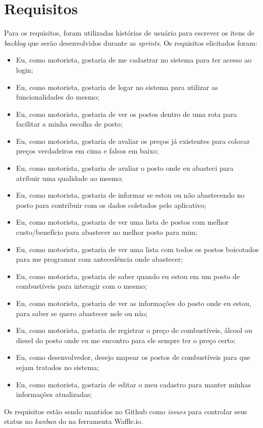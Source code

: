 \section{Requisitos}

Para os requisitos, foram utilizadas histórias de usuário para escrever os itens de \textit{backlog} que serão desenvolvidos durante as \textit{sprints}. Os requisitos elicitados foram:
\begin{itemize}
    \item Eu, como motorista, gostaria de me cadastrar no sistema para ter acesso ao login;
    \item Eu, como motorista, gostaria de logar no sistema para utilizar as funcionalidades do mesmo;
    \item Eu, como motorista, gostaria de ver os postos dentro de uma rota para facilitar a minha escolha de posto;
    \item Eu, como motorista, gostaria de avaliar os preços já existentes para colocar preços verdadeiros em cima e falsos em baixo;
    \item Eu, como motorista, gostaria de avaliar o posto onde eu abasteci para atribuir uma qualidade ao mesmo;
    \item Eu, como motorista, gostaria de informar se estou ou não abastecendo no posto para contribuir com os dados coletados pelo aplicativo;
    \item Eu, como motorista, gostaria de ver uma lista de postos com melhor custo/benefício para abastecer no melhor posto para mim;
    \item Eu, como motorista, gostaria de ver uma lista com todos os postos boicotados para me programar com antecedência onde abastecer;
    \item Eu, como motorista, gostaria de saber quando eu estou em um posto de combustíveis para interagir com o mesmo;
    \item Eu, como motorista, gostaria de ver as informações do posto onde eu estou, para saber se quero abastecer nele ou não;
    \item Eu, como motorista, gostaria de registrar o preço de combustíveis, álcool ou diesel do posto onde eu me encontro para ele sempre ter o preço certo;
    \item Eu, como desenvolvedor, desejo mapear os postos de combustíveis para que sejam tratados no sistema;
    \item Eu, como motorista, gostaria de editar o meu cadastro para manter minhas informações atualizadas;
\end{itemize}
Os requisitos estão sendo mantidos no Github como \textit{issues} para controlar seus status no \textit{kanban} do  na ferramenta Waffle.io.
